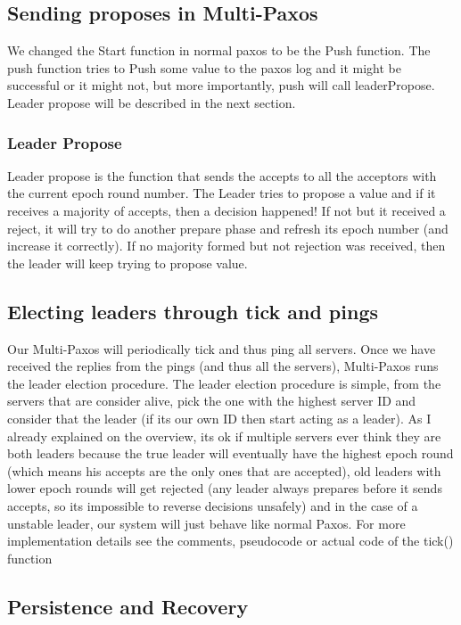 \documentclass[a4paper]{article}
\begin{document}
\subsection{Sending proposes in Multi-Paxos}

We changed the Start function in normal paxos to be the Push function.
The push function tries to Push some value to the paxos log and it might be successful or it might not, but more importantly, push will call leaderPropose. 
Leader propose will be described in the next section.

\subsubsection{Leader Propose}

Leader propose is the function that sends the accepts to all the acceptors with the current epoch round number.
The Leader tries to propose a value and if it receives a majority of accepts, then a decision happened!
If not but it received a reject, it will try to do another prepare phase and refresh its epoch number (and increase it correctly).
If no majority formed but not rejection was received, then the leader will keep trying to propose value.

\subsection{Electing leaders through tick and pings}

Our Multi-Paxos will periodically tick and thus ping all servers.
Once we have received the replies from the pings (and thus all the servers), Multi-Paxos  runs the leader election procedure.
The leader election procedure is simple, from the servers that are consider alive, pick the one with the highest server ID and consider that the leader (if its our own ID then start acting as a leader). 
As I already explained on the overview, its ok if multiple servers ever think they are both leaders because the true leader will eventually have the highest epoch round (which means his accepts are the only ones that are accepted), old leaders with lower epoch rounds will get rejected (any leader always prepares before it sends accepts, so its impossible to reverse decisions unsafely) and in the case of a unstable leader, our system will just behave like normal Paxos. 
For more implementation details see the comments, pseudocode or actual code of the tick() function

\subsection{Persistence and Recovery}
\end{document}
